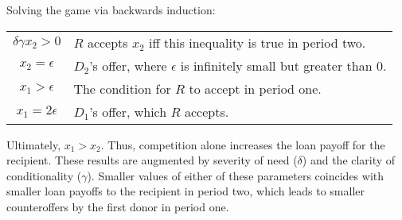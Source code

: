\documentclass{article}
\begin{document}
Solving the game via backwards induction:

\begin{center}
\begin{tabular}{c l}
    $\delta \gamma x_2 >0$ & $R$ accepts $x_2$ iff this inequality is true in period two. \\
    $x_2= \epsilon$ & $D_2$'s offer, where $\epsilon$ is infinitely small but greater than 0.\\
    $x_1>\epsilon$ & The condition for $R$ to accept in period one.\\
    $x_1=2 \epsilon$ & $D_1$'s offer, which $R$ accepts.\\
\end{tabular}
\end{center}

Ultimately, $x_1>x_2$. Thus, competition alone increases the loan payoff for the recipient. These results are augmented by severity of need ($\delta$) and the clarity of conditionality ($\gamma$). Smaller values of either of these parameters coincides with smaller loan payoffs to the recipient in period two, which leads to smaller counteroffers by the first donor in period one.

\pagebreak
\printbibliography
\end{document}
